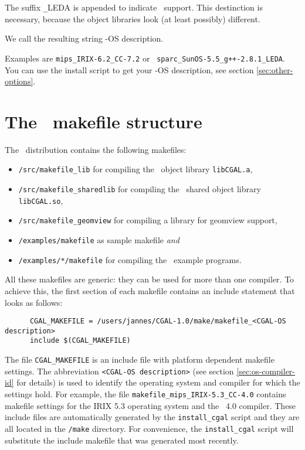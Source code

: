 The suffix \texttt{\_}LEDA is appended to indicate \leda\ support. This
destinction is necessary, because the object libraries look (at least
possibly) different.

We call the resulting string \cgal-OS description. 

Examples are \texttt{mips\_IRIX-6.2\_CC-7.2} or {\tt
  sparc\_SunOS-5.5\_g++-2.8.1\_LEDA}. You can use the install
script to get your \cgal-OS description, see section
\ref{sec:other-options}.

\section{The \cgal\ makefile structure \label{sec:makefiles}}

The \cgal\ distribution contains the following makefiles:
\begin{itemize}
\item \texttt{\cgaldir/src/makefile\_lib} for compiling the \cgal\ 
  object library \texttt{libCGAL.a},
  
\item \texttt{\cgaldir/src/makefile\_sharedlib} for compiling the
  \cgal\ shared object library \texttt{libCGAL.so},
  
\item \texttt{\cgaldir/src/makefile\_geomview} for compiling a library
  for geomview support,
  
\item \texttt{\cgaldir/examples/makefile} as sample makefile
  \textit{and}
  
\item \texttt{\cgaldir/examples/*/makefile} for compiling the \cgal\ 
  example programs.
\end{itemize}

All these makefiles are generic: they can be used for more than one compiler.
To achieve this, the first section of each makefile contains an include
statement that looks as follows:

\begin{verbatim}
      CGAL_MAKEFILE = /users/jannes/CGAL-1.0/make/makefile_<CGAL-OS description>
      include $(CGAL_MAKEFILE)
\end{verbatim}

The file \texttt{CGAL\_MAKEFILE} is an include file with platform
dependent makefile settings. The abbreviation \texttt{<CGAL-OS description>}
(see section \ref{sec:os-compiler-id} for details) is
used to identify the operating system and compiler for which the
settings hold. For example, the file
\texttt{makefile\_mips\_IRIX-5.3\_CC-4.0} contains makefile settings
for the IRIX 5.3 operating system and the \mipsprocc\ 4.0
compiler. These include files are automatically generated by the
\texttt{install\_cgal} script and they are all located in the
\texttt{\cgaldir/make} directory.
For convenience, the \texttt{install\_cgal} script will substitute the 
include makefile that was generated most recently.

